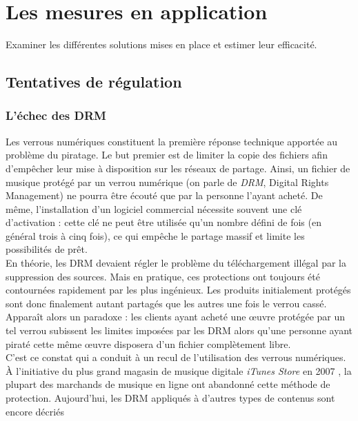\documentclass[a4paper]{report}
\begin{document}
	\chapter{Les mesures en application}
	Examiner les différentes solutions mises en place et estimer leur efficacité.

	\section{Tentatives de régulation}

		\subsection{L'échec des DRM}
		Les verrous numériques constituent la première réponse technique apportée au problème du piratage. Le but premier est de limiter la copie des fichiers afin d'empêcher leur mise à disposition sur les réseaux de partage. Ainsi, un fichier de musique protégé par un verrou numérique (on parle de \emph{DRM}, Digital Rights Management) ne pourra être écouté que par la personne l'ayant acheté. De même, l'installation d'un logiciel commercial nécessite souvent une clé d'activation : cette clé ne peut être utilisée qu'un nombre défini de fois (en général trois à cinq fois), ce qui empêche le partage massif et limite les possibilités de prêt.\\

		En théorie, les DRM devaient régler le problème du téléchargement illégal par la suppression des sources. Mais en pratique, ces protections ont toujours été contournées rapidement par les plus ingénieux. Les produits initialement protégés sont donc finalement autant partagés que les autres une fois le verrou cassé. Apparaît alors un paradoxe : les clients ayant acheté une œuvre protégée par un tel verrou subissent les limites imposées par les DRM alors qu'une personne ayant piraté cette même œuvre disposera d'un fichier complètement libre.\\

		C'est ce constat qui a conduit à un recul de l'utilisation des verrous numériques. À l'initiative du plus grand magasin de musique digitale \emph{iTunes Store} en 2007 \cite{itunes-plus-release}, la plupart des marchands de musique en ligne ont abandonné cette méthode de protection. Aujourd'hui, les DRM appliqués à d'autres types de contenus sont encore décriés
\end{document}

